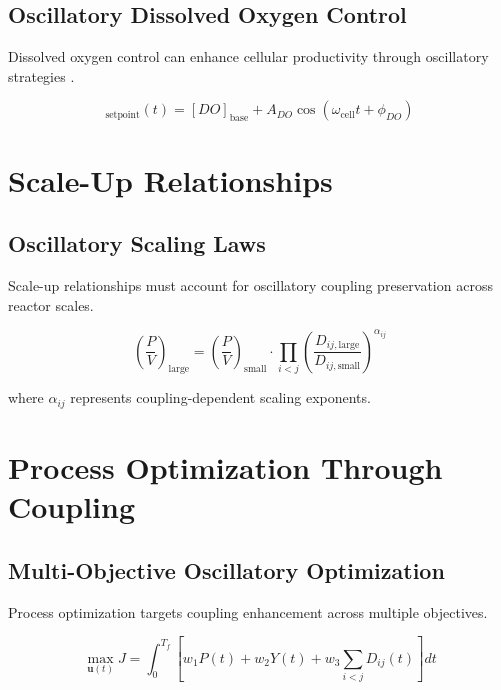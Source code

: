 \documentclass[twocolumn]{article}
\begin{document}
\subsection{Oscillatory Dissolved Oxygen Control}

Dissolved oxygen control can enhance cellular productivity through oscillatory strategies \citep{zhang2010oscillatory}.

\begin{equation}
[DO]_{\text{setpoint}}(t) = [DO]_{\text{base}} + A_{DO} \cos(\omega_{\text{cell}}t + \phi_{DO})
\label{eq:oscillatory_do}
\end{equation}

\section{Scale-Up Relationships}

\subsection{Oscillatory Scaling Laws}

Scale-up relationships must account for oscillatory coupling preservation across reactor scales.

\begin{equation}
\left(\frac{P}{V}\right)_{\text{large}} = \left(\frac{P}{V}\right)_{\text{small}} \cdot \prod_{i<j} \left(\frac{D_{ij,\text{large}}}{D_{ij,\text{small}}}\right)^{\alpha_{ij}}
\label{eq:oscillatory_scaleup}
\end{equation}

where $\alpha_{ij}$ represents coupling-dependent scaling exponents.

\section{Process Optimization Through Coupling}

\subsection{Multi-Objective Oscillatory Optimization}

Process optimization targets coupling enhancement across multiple objectives.

\begin{equation}
\max_{\mathbf{u}(t)} J = \int_0^{T_f} \left[ w_1 P(t) + w_2 Y(t) + w_3 \sum_{i<j} D_{ij}(t) \right] dt
\label{eq:multi_objective}
\end{equation}
\end{document}
